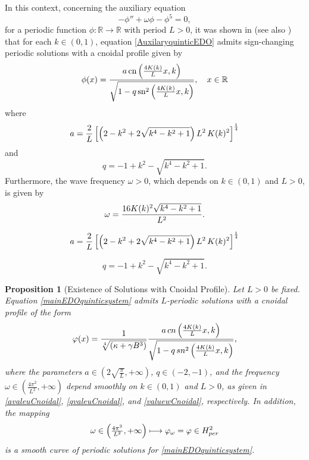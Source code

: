 \documentclass[10pt,a4paper]{amsart}
\newtheorem{proposition}{Proposition}
\begin{document}
In this context, concerning the auxiliary equation
\begin{equation}\label{AuxilaryquinticEDO}
	- \phi'' + \omega \phi - \phi^5 = 0,
\end{equation}
for a periodic function $\phi: \mathbb{R} \to \mathbb{R}$ with period $L > 0$, it was shown in \cite[Section 4.3]{NataliCardosoAmaral} (see also \cite{BittencourtLoreno2022}) that for each $k \in (0,1)$, equation \eqref{AuxilaryquinticEDO} admits sign-changing periodic solutions with a cnoidal profile given by
\begin{equation}\label{cnoidalsolution}
	\phi(x) = \frac{a \, \text{cn} \left( \frac{4{\rm K}(k)}{L} x, k \right)}{\sqrt{1 - q \, \text{sn}^2 \left( \frac{4{\rm K}(k)}{L} x, k \right)}}, \quad x \in \mathbb{R}
\end{equation}
where
\begin{equation}\label{avaleuCnoidal}
	a = \frac{2}{L} \left[ \left( 2 - k^2 + 2 \sqrt{k^4 - k^2 + 1}\right) L^2 \, {\rm K}(k)^2 \right]^{\frac{1}{4}}
\end{equation}
and
\begin{equation}\label{qvaleuCnoidal}
	q = -1 + k^2 - \sqrt{k^4 - k^2 + 1}.
\end{equation}
Furthermore, the wave frequency $\omega>0$, which depends on $k \in (0,1)$ and $L>0$, is given by
\begin{eqnarray}\label{valuewCnoidal}
	\omega =  \frac{16{\rm K}(k)^2 \sqrt{k^4 - k^2 +1 }}{L^2}.
\end{eqnarray}

\begin{equation}
	a = \frac{2}{L} \left[ \left( 2 - k^2 + 2 \sqrt{k^4 - k^2 + 1}\right) L^2 \, {\rm K}(k)^2 \right]^{\frac{1}{4}}
\end{equation}

\begin{equation}
	q = -1 + k^2 - \sqrt{k^4 - k^2 + 1}.
\end{equation}

\begin{proposition}[Existence of Solutions with Cnoidal Profile]\label{cnoidalcurve}
	Let $L>0$ be fixed. Equation \eqref{mainEDOquinticsystem} admits $L$-periodic solutions with a cnoidal profile of the form
	\begin{equation}\label{cnoidal-solution}
		\varphi(x) = \frac{1}{\sqrt[4]{(\kappa + \gamma B^3)}}\frac{ a \, {\rm cn}\left( \frac{4{\rm K}(k)}{L}x,k\right)}{\sqrt{ 1 - q \, {\rm sn}^2 \left( \frac{4 {\rm K}(k)}{L} x, k \right)}},
	\end{equation}
	where the parameters $a \in \left( 2\sqrt{\tfrac{\pi}{L}}, +\infty \right)$, $q \in (-2,-1)$, and the frequency $\omega \in \left( \frac{4\pi^2}{L^2},+\infty\right)$ depend smoothly on $k\in (0,1)$ and $L>0$, as given in \eqref{avaleuCnoidal}, \eqref{qvaleuCnoidal}, and \eqref{valuewCnoidal}, respectively. In addition, the mapping
	$$\omega \in \left( \tfrac{4\pi^2}{L^2},+\infty \right) \longmapsto \varphi_\omega=\varphi \in H^2_{\rm per}$$
	is a smooth curve of periodic solutions for \eqref{mainEDOquinticsystem}.
\end{proposition}
\end{document}
